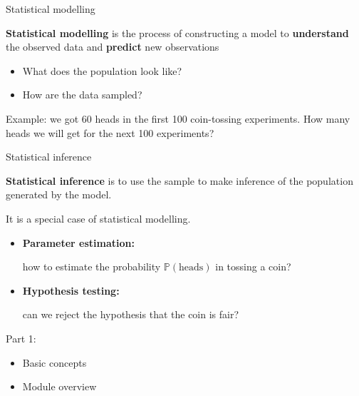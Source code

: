 \documentclass{beamer}
\newcommand{\Pb}{\mathbb{P}}
\begin{document}
\begin{frame}{Statistical modelling}

{\bf Statistical modelling} is the process of constructing a model to {\bf understand} 
the observed data and {\bf predict}
new observations

\begin{itemize}
\item[$\rhd$] What does the population look like?
\item[$\rhd$] How are the data sampled? 
\end{itemize}


Example: we got 60 heads in the first 100 coin-tossing experiments. How many heads we will get for the next 100 experiments? 


\end{frame}

\begin{frame}{Statistical inference}

{\bf Statistical inference} is to use the sample to make inference of the population generated by the model.


It is a special case of statistical modelling. 
\begin{itemize}
\item[$\rhd$] {\bf Parameter estimation: }

how to estimate the probability $\Pb(\text{heads})$ in tossing a coin? 
\item[$\rhd$] {\bf Hypothesis testing: }

can we reject the hypothesis that the coin is fair? 
\end{itemize}



\end{frame}


\begin{frame}

Part 1: \begin{itemize}
\item Basic concepts

\item  Module overview 
\end{itemize}
\end{frame}
\end{document}
